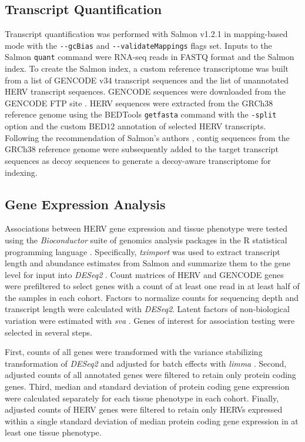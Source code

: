 \documentclass[11pt,letterpaper]{article}
\begin{document}
\subsection*{Transcript Quantification}
Transcript quantification was performed with Salmon v1.2.1 \citep{Patro2017} in mapping-based mode with the \verb|--gcBias| and \verb|--validateMappings| flags set.
Inputs to the Salmon \verb|quant| command were RNA-seq reads in FASTQ format and the Salmon index.
To create the Salmon index, a custom reference transcriptome was built from a list of GENCODE v34  transcript sequences \citep{Frankish2018} and the list of unannotated HERV transcript sequences.
GENCODE sequences were downloaded from the GENCODE FTP site \citep{GENCODE-transcripts}.
HERV sequences were extracted from the GRCh38 reference genome \citep{ENCODE-GRCh38} using the BEDTools \citep{Quinlan2010} \verb|getfasta| command with the \verb|-split| option and the custom BED12 annotation of selected HERV transcripts.
Following the recommendation of Salmon's authors \citep{SalmonDecoys}, contig sequences from the GRCh38 reference genome were subsequently added to the target transcript sequences as decoy sequences to generate a decoy-aware transcriptome for indexing.

\subsection*{Gene Expression Analysis}
Associations between HERV gene expression and tissue phenotype were tested using the \emph{Bioconductor} suite of genomics analysis packages \citep{bioc} in the R statistical programming language \citep{R}.
Specifically, \emph{tximport} \citep{Soneson2015} was used to extract transcript length and abundance estimates from Salmon and summarize them to the gene level for input into \emph{DESeq2} \citep{Love2014}.
Count matrices of HERV and GENCODE genes were prefiltered to select genes with a count of at least one read in at least half of the samples in each cohort.
Factors to normalize counts for sequencing depth and transcript length were calculated with \emph{DESeq2}.
Latent factors of non-biological variation were estimated with \emph{sva} \citep{sva}.
Genes of interest for association testing were selected in several steps.

First, counts of all genes were transformed with the variance stabilizing transformation of \emph{DESeq2} and adjusted for batch effects with \emph{limma} \citep{Ritchie2015}.
Second, adjusted counts of all annotated genes were filtered to retain only protein coding genes.
Third, median and standard deviation of protein coding gene expression were calculated separately for each tissue phenotype in each cohort.
Finally, adjusted counts of HERV genes were filtered to retain only HERVs expressed within a single standard deviation of median protein coding gene expression in at least one tissue phenotype.
\end{document}
